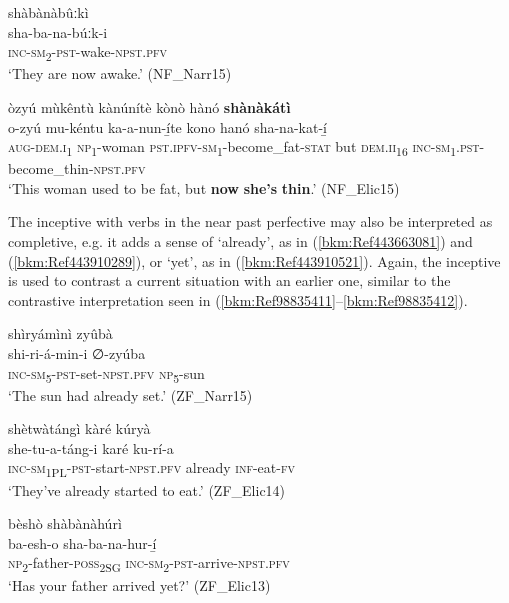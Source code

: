 \ea
\glll shàbànàbûːkì\\
sha-ba-na-búːk-i\\
\textsc{inc}-\textsc{sm}\textsubscript{2}-\textsc{pst}-wake-\textsc{npst}.\textsc{pfv}\\
\glt ‘They are now awake.’ (NF\_Narr15)
\z

\ea
\label{bkm:Ref98835412}
òzyú mùkêntù kànúnítè kònò hànó \textbf{shànàkátì}\\
\gll o-zyú    mu-kéntu  ka-a-nun-í̲te kono  hanó    sha-na-kat-í̲\\
\textsc{aug}-\textsc{dem}.\textsc{i}\textsubscript{1}  \textsc{np}\textsubscript{1}-woman  \textsc{pst}.\textsc{ipfv}-\textsc{sm}\textsubscript{1}-become\_fat-\textsc{stat}
but  \textsc{dem}.\textsc{ii}\textsubscript{16}  \textsc{inc}-\textsc{sm}\textsubscript{1}.\textsc{pst}-become\_thin-\textsc{npst}.\textsc{pfv}\\
\glt ‘This woman used to be fat, but \textbf{now} \textbf{she’s} \textbf{thin}.’ (NF\_Elic15)
\z

The inceptive with verbs in the near past perfective may also be interpreted as completive, e.g. it adds a sense of ‘already’, as in (\ref{bkm:Ref443663081}) and (\ref{bkm:Ref443910289}), or ‘yet’, as in (\ref{bkm:Ref443910521}). Again, the inceptive is used to contrast a current situation with an earlier one, similar to the contrastive interpretation seen in (\ref{bkm:Ref98835411}--\ref{bkm:Ref98835412}).

\ea
\label{bkm:Ref443663081}
shìryámìnì zyûbà\\
\gll shi-ri-á-min-i      ∅-zyúba\\
\textsc{inc}-\textsc{sm}\textsubscript{5}\--\textsc{pst}-set-\textsc{npst}.\textsc{pfv}    \textsc{np}\textsubscript{5}-sun\\
\glt ‘The sun had already set.’ (ZF\_Narr15)
\z

\ea
\label{bkm:Ref443910289}
shètwàtángì kàré kúryà\\
\gll she-tu-a-táng-i      karé    ku-rí-a\\
\textsc{inc}-\textsc{sm}\textsubscript{1PL}-\textsc{pst}-start-\textsc{npst}.\textsc{pfv}  already  \textsc{inf}-eat-\textsc{fv}\\
\glt ‘They’ve already started to eat.’ (ZF\_Elic14)
\z

\ea
\label{bkm:Ref443910521}
bèshò shàbànàhúrì\\
\gll ba-esh-o    sha-ba-na-hur-í̲\\
\textsc{np}\textsubscript{2}-father-\textsc{poss}\textsubscript{2SG}  \textsc{inc}-\textsc{sm}\textsubscript{2}-\textsc{pst}-arrive-\textsc{npst}.\textsc{pfv}\\
\glt ‘Has your father arrived yet?’ (ZF\_Elic13)
\z

